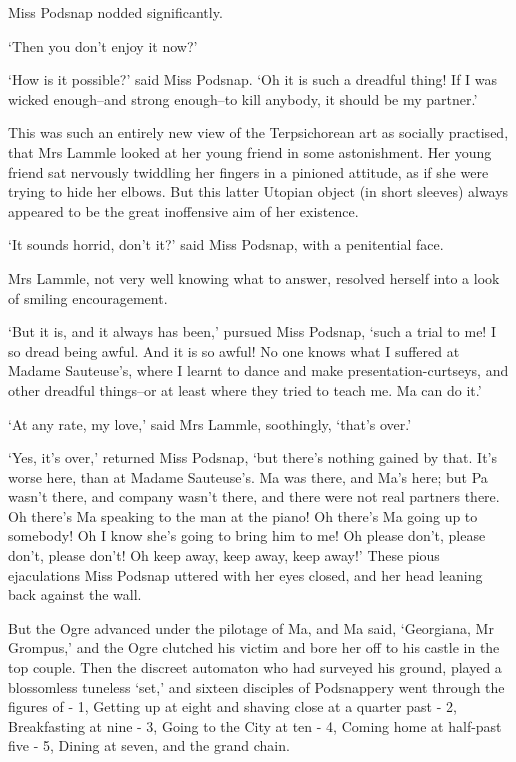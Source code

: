 Miss Podsnap nodded significantly.

‘Then you don’t enjoy it now?’

‘How is it possible?’ said Miss Podsnap. ‘Oh it is such a dreadful
thing! If I was wicked enough--and strong enough--to kill anybody, it
should be my partner.’

This was such an entirely new view of the Terpsichorean art as
socially practised, that Mrs Lammle looked at her young friend in some
astonishment. Her young friend sat nervously twiddling her fingers in
a pinioned attitude, as if she were trying to hide her elbows. But this
latter Utopian object (in short sleeves) always appeared to be the great
inoffensive aim of her existence.

‘It sounds horrid, don’t it?’ said Miss Podsnap, with a penitential
face.

Mrs Lammle, not very well knowing what to answer, resolved herself into
a look of smiling encouragement.

‘But it is, and it always has been,’ pursued Miss Podsnap, ‘such a trial
to me! I so dread being awful. And it is so awful! No one knows what
I suffered at Madame Sauteuse’s, where I learnt to dance and make
presentation-curtseys, and other dreadful things--or at least where they
tried to teach me. Ma can do it.’

‘At any rate, my love,’ said Mrs Lammle, soothingly, ‘that’s over.’

‘Yes, it’s over,’ returned Miss Podsnap, ‘but there’s nothing gained by
that. It’s worse here, than at Madame Sauteuse’s. Ma was there, and Ma’s
here; but Pa wasn’t there, and company wasn’t there, and there were not
real partners there. Oh there’s Ma speaking to the man at the piano! Oh
there’s Ma going up to somebody! Oh I know she’s going to bring him
to me! Oh please don’t, please don’t, please don’t! Oh keep away, keep
away, keep away!’ These pious ejaculations Miss Podsnap uttered with her
eyes closed, and her head leaning back against the wall.

But the Ogre advanced under the pilotage of Ma, and Ma said, ‘Georgiana,
Mr Grompus,’ and the Ogre clutched his victim and bore her off to his
castle in the top couple. Then the discreet automaton who had surveyed
his ground, played a blossomless tuneless ‘set,’ and sixteen disciples
of Podsnappery went through the figures of - 1, Getting up at eight and
shaving close at a quarter past - 2, Breakfasting at nine - 3, Going to
the City at ten - 4, Coming home at half-past five - 5, Dining at seven,
and the grand chain.

